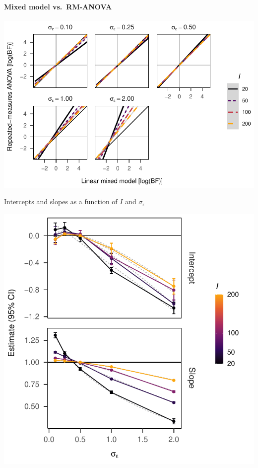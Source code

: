 \documentclass[
  a4paper,
  DIV=11,
  numbers=noendperiod,
  oneside]{scrartcl}
\let\oldparagraph\paragraph
\renewcommand{\paragraph}[1]{\oldparagraph{#1}\mbox{}}
\begin{document}
\hypertarget{mixed-model-vs.-rm-anova-1}{%
\paragraph{Mixed model vs.~RM-ANOVA}\label{mixed-model-vs.-rm-anova-1}}

\includegraphics{prior_translation_files/figure-pdf/trend-plots-anova-1.pdf}

Intercepts and slopes as a function of \(I\) and \(\sigma_\epsilon\)

\includegraphics{prior_translation_files/figure-pdf/trend-plots-anova-exploration-1.pdf}
\end{document}
